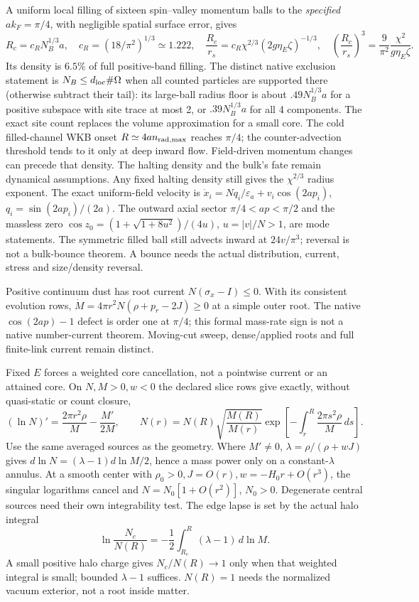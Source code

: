 \documentclass[10pt]{article}
\begin{document}
A uniform local filling of sixteen
spin--valley momentum balls to the \emph{specified}
\(ak_F=\pi/4\), with negligible spatial surface error,
gives
\[
 R_c=c_RN_B^{1/3}a,\quad c_R=(18/\pi^2)^{1/3}\simeq1.222,
 \quad
 \frac{R_c}{r_s}=c_R\chi^{2/3}(2g\eta_E\zeta)^{-1/3},
 \quad
 \left(\frac{R_c}{r_s}\right)^3
 =\frac9{\pi^2}\frac{\chi^2}{g\eta_E\zeta}.
\]
Its density is \(6.5\%\) of full positive-band filling.
The distinct native exclusion statement is
\(N_B\le d_{\rm loc}\#\Omega\) when all counted particles
are supported there (otherwise subtract their tail): its large-ball radius
floor is about \(.49N_B^{1/3}a\) for a positive subspace
with site trace at most 2, or \(.39N_B^{1/3}a\) for all
4 components. The exact site count replaces the volume
approximation for a small core. The cold filled-channel
WKB onset \(R\simeq4a n_{\rm rad,max}\) reaches
\(\pi/4\); the counter-advection threshold tends to it
only at deep inward flow. Field-driven momentum changes
can precede that density. The halting density and the bulk's
fate remain dynamical assumptions. Any fixed halting density
still gives the \(\chi^{2/3}\) radius exponent.
The exact uniform-field velocity is
\(\dot x_i=Nq_i/\varepsilon_a+v_i\cos(2ap_i)\),
\(q_i=\sin(2ap_i)/(2a)\). The outward axial sector
\(\pi/4<ap<\pi/2\) and the massless zero
\(\cos z_0=(1+\sqrt{1+8u^2})/(4u)\), \(u=|v|/N>1\),
are mode statements. The symmetric filled ball still
advects inward at \(24v/\pi^3\); reversal is not a
bulk-bounce theorem. A bounce needs the actual
distribution, current, stress and size/density reversal.

Positive continuum dust has root current
\(N(\sigma_x-I)\le0\). With its consistent evolution
rows, \(\dot M=4\pi r^2N(\rho+p_r-2J)\ge0\) at a
simple outer root. The native \(\cos(2ap)-1\) defect
is order one at \(\pi/4\); this formal mass-rate sign
is not a native number-current theorem. Moving-cut
sweep, dense/applied roots and full finite-link
current remain distinct.

Fixed \(E\) forces a weighted core cancellation, not a
pointwise current or an attained core. On \(N,M>0,w<0\)
the declared slice rows give exactly, without quasi-static
or count closure,
\[
 (\ln N)'=\frac{2\pi r^2\rho}{M}-\frac{M'}{2M},\qquad
 N(r)=N(R)\sqrt{\frac{M(R)}{M(r)}}
       \exp\!\left[-\int_r^R\frac{2\pi s^2\rho}{M}\,ds\right].
\]
Use the same averaged sources as the geometry. Where
\(M'\ne0\), \(\lambda=\rho/(\rho+wJ)\) gives
\(d\ln N=(\lambda-1)d\ln M/2\), hence a mass power only
on a constant-\(\lambda\) annulus. At a smooth center with
\(\rho_0>0,J=O(r),w=-H_0r+O(r^3)\), the singular
logarithms cancel and \(N=N_0[1+O(r^2)]\), \(N_0>0\).
Degenerate central sources need their own integrability test.
The edge lapse is set by the actual halo integral
\[
 \ln\frac{N_c}{N(R)}=-\frac12\int_{R_c}^{R}
                       (\lambda-1)\,d\ln M .
\]
A small positive halo charge gives \(N_c/N(R)\to1\)
only when that weighted integral is small; bounded
\(\lambda-1\) suffices. \(N(R)=1\) needs the normalized
vacuum exterior, not a root inside matter.
\end{document}
